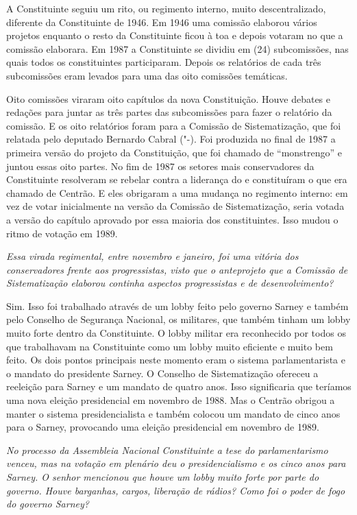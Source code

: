 A Constituinte seguiu um rito, ou regimento interno, muito
descentralizado, diferente da Constituinte de 1946. Em 1946 uma comissão
elaborou vários projetos enquanto o resto da Constituinte ficou à toa e
depois votaram no que a comissão elaborara. Em 1987 a Constituinte se
dividiu em (24) subcomissões, nas quais todos os constituintes
participaram. Depois os relatórios de cada três subcomissões eram
levados para uma das oito comissões temáticas.

Oito comissões viraram oito capítulos da nova Constituição. Houve
debates e redações para juntar as três partes das subcomissões para
fazer o relatório da comissão. E os oito relatórios foram para a
Comissão de Sistematização, que foi relatada pelo deputado Bernardo
Cabral ("-). Foi produzida no final de 1987 a primeira versão do
projeto da Constituição, que foi chamado de ``monstrengo'' e juntou
essas oito partes. No fim de 1987 os setores mais conservadores da
Constituinte resolveram se rebelar contra a liderança do  e
constituíram o que era chamado de Centrão. E eles obrigaram a uma
mudança no regimento interno: em vez de votar inicialmente na versão da
Comissão de Sistematização, seria votada a versão do capítulo aprovado
por essa maioria dos constituintes. Isso mudou o ritmo de votação em
1989.

\medskip

\noindent\emph{Essa virada regimental, entre novembro e janeiro, foi uma
vitória dos conservadores frente aos progressistas, visto que o
anteprojeto que a Comissão de Sistematização elaborou continha aspectos
progressistas e de desenvolvimento?}

Sim. Isso foi trabalhado através de um lobby feito
pelo governo Sarney e também pelo Conselho de Segurança Nacional, os
militares, que também tinham um lobby muito forte dentro da
Constituinte. O lobby militar era reconhecido por todos os que
trabalhavam na Constituinte como um lobby muito eficiente e muito bem
feito. Os dois pontos principais neste momento eram o sistema
parlamentarista e o mandato do presidente Sarney. O Conselho de
Sistematização ofereceu a reeleição para Sarney e um mandato de quatro
anos. Isso significaria que teríamos uma nova eleição presidencial em
novembro de 1988. Mas o Centrão obrigou a manter o sistema
presidencialista e também colocou um mandato de cinco anos para o
Sarney, provocando uma eleição presidencial em novembro de 1989.

\medskip

\noindent\emph{No processo da Assembleia Nacional Constituinte a tese do
parlamentarismo venceu, mas na votação em plenário deu o
presidencialismo e os cinco anos para Sarney. O senhor mencionou que
houve um lobby muito forte por parte do governo. Houve barganhas, cargos,
liberação de rádios? Como foi o poder de fogo do governo Sarney?}

